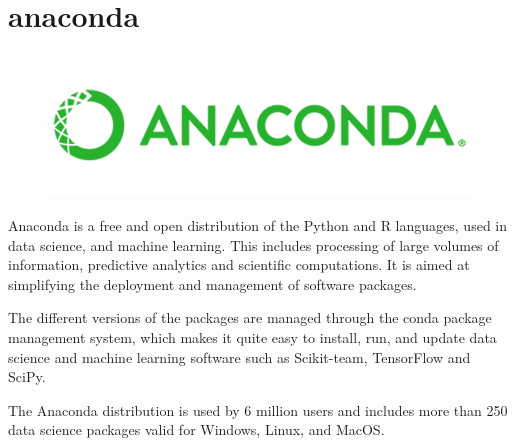 	\section{anaconda}
		\begin{figure}[h!]
			\centering
			\includegraphics[width=0.7\linewidth]{Images/logos/anaconda}
			\label{fig:anaconda}
		\end{figure}
		Anaconda is a free and open distribution of the Python and R languages, used in data science, and machine learning. This includes processing of large volumes of information, predictive analytics and scientific computations. It is aimed at simplifying the deployment and management of software packages.
		
		The different versions of the packages are managed through the conda package management system, which makes it quite easy to install, run, and update data science and machine learning software such as Scikit-team, TensorFlow and SciPy.
		
		The Anaconda distribution is used by 6 million users and includes more than 250 data science packages valid for Windows, Linux, and MacOS.

	
